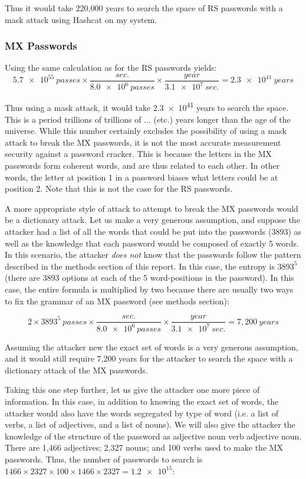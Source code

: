\documentclass{article}
\begin{document}
Thus it would take 220,000 years to search the space of RS passwords with a mask attack using Hashcat on my system.

\subsubsection*{MX Passwords}
Using the same calculation as for the RS passwords yields:
$$\num{5.7e55}~passes \times \frac{sec.}{\num{8.0e6}~passes} \times \frac{year}{\num{3.1e7}~sec.} = \num{2.3e41}~years$$

Thus using a mask attack, it would take \num{2.3e41} years to search the space. This is a period trillions of trillions of ... (etc.) years longer than the age of the universe. While this number certainly excludes the possibility of using a mask attack to break the MX passwords, it is not the most accurate measurement security against a password cracker. This is because the letters in the MX passwords form coherent words, and are thus related to each other. In other words, the letter at position 1 in a password biases what letters could be at position 2. Note that this is not the case for the RS passwords. 

A more appropriate style of attack to attempt to break the MX passwords would be a dictionary attack. Let us make a very generous assumption, and suppose the attacker had a list of all the words that could be put into the passwords (3893) as well as the knowledge that each password would be composed of exactly 5 words. In this scenario, the attacker \emph{does not} know that the passwords follow the pattern described in the methods section of this report. In this case, the entropy is $3893^5$ (there are 3893 options at each of the 5 word-positions in the password). In this case, the entire formula is multiplied by two because there are usually two ways to fix the grammar of an MX password (see methods section):

$$2 \times 3893^5~passes \times \frac{sec.}{\num{8.0e6}~passes} \times \frac{year}{\num{3.1e7}~sec.} = 7,200~years$$

Assuming the attacker new the exact set of words is a very generous assumption, and it would still require 7,200 years for the attacker to search the space with a dictionary attack of the MX passwords. 

Taking this one step further, let us give the attacker one more piece of information. In this case, in addition to knowing the exact set of words, the attacker would also have the words segregated by type of word (i.e. a list of verbs, a list of adjectives, and a list of nouns). We will also give the attacker the knowledge of the structure of the password as adjective noun verb adjective noun. There are 1,466 adjectives; 2,327 nouns; and 100 verbs used to make the MX passwords. Thus, the number of passwords to search is $1466 \times 2327 \times 100 \times 1466 \times 2327 = \num{1.2e15}$:
\end{document}
